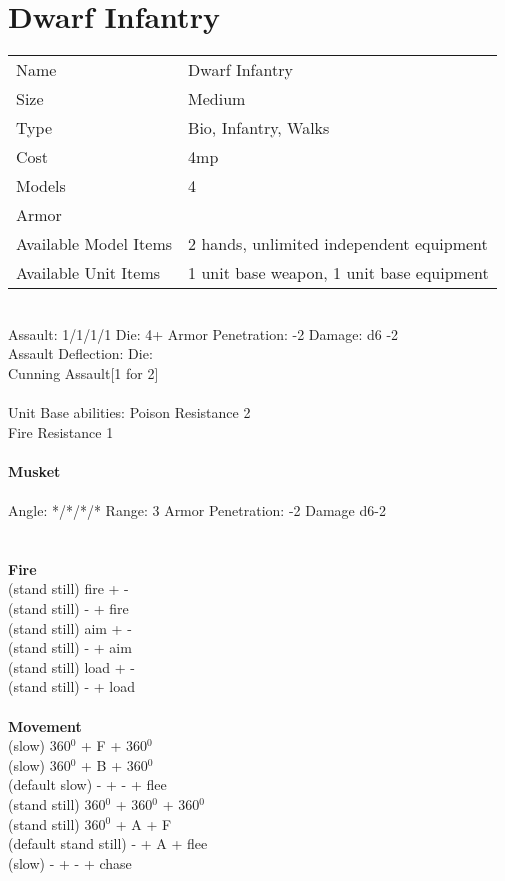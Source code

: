 \pagebreak

\section{ Dwarf Infantry }

\begin{tabular}{ll}
  Name & Dwarf Infantry \\
  Size & Medium\\
  Type & Bio, Infantry, Walks\\
  Cost & 4mp\\
  Models & 4\\
  Armor & \\
  Available Model Items & 2 hands, unlimited independent equipment \\
  Available Unit Items & 1 unit base weapon, 1 unit base equipment \\
\end{tabular}

\ \\
Assault: 1/1/1/1 Die: 4+ Armor Penetration: -2 Damage: d6 -2 \\
Assault Deflection:  Die: \\
\indent Cunning Assault[1 for 2] \\
\ \\
Unit Base abilities: Poison Resistance 2 \\ Fire Resistance 1
\ \\
\ \\
{\bf Musket } \\
\ \\
Angle: */*/*/* Range: 3 Armor Penetration: -2 Damage d6-2 \\
\indent  \\





\ \\ {\bf Fire } \\
(stand still) fire + - \\
(stand still) - + fire \\
(stand still) aim + - \\
(stand still) - + aim \\
(stand still) load + - \\
(stand still) - + load \\
\ \\ {\bf Movement } \\
(slow) 360$^0$ + F + 360$^0$ \\
(slow) 360$^0$ + B + 360$^0$ \\
(default slow) - + - + flee \\
(stand still) 360$^0$ + 360$^0$ + 360$^0$ \\
(stand still) 360$^0$ + A + F \\
(default stand still) - + A + flee \\
(slow) - + - + chase \\



